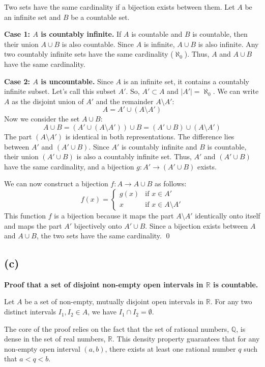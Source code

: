 \documentclass[12pt,a4paper]{article}
\theoremstyle{definition}
\theoremstyle{remark}
\begin{document}
Two sets have the same cardinality if a bijection exists between them. Let $A$ be an infinite set and $B$ be a countable set.

\textbf{Case 1: $A$ is countably infinite.}
If $A$ is countable and $B$ is countable, then their union $A \cup B$ is also countable. Since $A$ is infinite, $A \cup B$ is also infinite. Any two countably infinite sets have the same cardinality ($\aleph_0$). Thus, $A$ and $A \cup B$ have the same cardinality.

\textbf{Case 2: $A$ is uncountable.}
Since $A$ is an infinite set, it contains a countably infinite subset. Let's call this subset $A'$. So, $A' \subset A$ and $|A'| = \aleph_0$.
We can write $A$ as the disjoint union of $A'$ and the remainder $A \setminus A'$:
\[ A = A' \cup (A \setminus A') \]
Now we consider the set $A \cup B$:
\[ A \cup B = (A' \cup (A \setminus A')) \cup B = (A' \cup B) \cup (A \setminus A') \]
The part $(A \setminus A')$ is identical in both representations. The difference lies between $A'$ and $(A' \cup B)$.
Since $A'$ is countably infinite and $B$ is countable, their union $(A' \cup B)$ is also a countably infinite set.
Thus, $A'$ and $(A' \cup B)$ have the same cardinality, and a bijection $g: A' \to (A' \cup B)$ exists.

We can now construct a bijection $f: A \to A \cup B$ as follows:
\[
f(x) =
\begin{cases}
g(x) & \text{if } x \in A' \\
x & \text{if } x \in A \setminus A'
\end{cases}
\]
This function $f$ is a bijection because it maps the part $A \setminus A'$ identically onto itself and maps the part $A'$ bijectively onto $A' \cup B$.
Since a bijection exists between $A$ and $A \cup B$, the two sets have the same cardinality. \qed

\subsection*{(c)}
\textbf{Proof that a set of disjoint non-empty open intervals in $\mathbb{R}$ is countable.}

Let $A$ be a set of non-empty, mutually disjoint open intervals in $\mathbb{R}$. For any two distinct intervals $I_1, I_2 \in A$, we have $I_1 \cap I_2 = \emptyset$.

The core of the proof relies on the fact that the set of rational numbers, $\mathbb{Q}$, is dense in the set of real numbers, $\mathbb{R}$. This density property guarantees that for any non-empty open interval $(a, b)$, there exists at least one rational number $q$ such that $a < q < b$.
\end{document}

